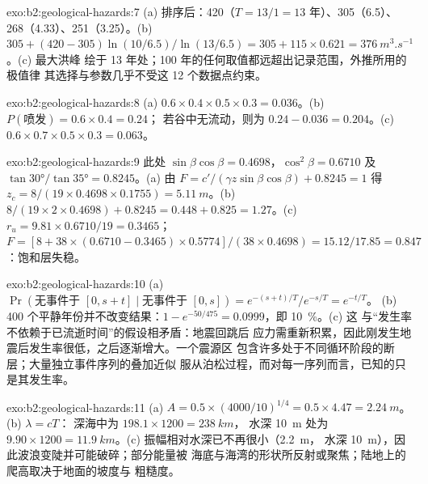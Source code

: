 \begin{solution}{exo:b2:geological-hazards:7}
(a) 排序后：420（$T = 13/1 = 13$ 年）、305（6.5）、268（4.33）、251（3.25）。(b) $305 + (420 -
305)\ln(10/6.5)/\ln(13/6.5) = 305 + 115 \times 0.621 = \qty{376}{m^3.s^{-1}}$。(c) 最大洪峰
绘于 13 年处；100 年的任何取值都远超出记录范围，外推所用的极值律
其选择与参数几乎不受这 12 个数据点约束。
\end{solution}

\begin{solution}{exo:b2:geological-hazards:8}
(a) $0.6 \times 0.4 \times 0.5 \times 0.3 = 0.036$。(b) $P(\text{喷发}) = 0.6 \times 0.4 = 0.24$；
若谷中无流动，则为 $0.24 - 0.036 = 0.204$。(c) $0.6 \times 0.7 \times 0.5 \times 0.3 =
0.063$。
\end{solution}

\begin{solution}{exo:b2:geological-hazards:9}
此处 $\sin\beta\cos\beta = 0.4698$，$\cos^2\beta = 0.6710$ 及 $\tan\ang{30}/\tan\ang{35} =
0.8245$。(a) 由 $F = c'/(\gamma z\sin\beta\cos\beta) + 0.8245 = 1$ 得 $z_c = 8/(19 \times 0.4698
\times 0.1755) = \qty{5.11}{m}$。(b) $8/(19 \times 2 \times 0.4698) + 0.8245 = 0.448 + 0.825 =
1.27$。(c) $r_u = 9.81 \times 0.6710/19 = 0.3465$；$F = [8 + 38 \times (0.6710 - 0.3465) \times
0.5774]/(38 \times 0.4698) = 15.12/17.85 = 0.847$：饱和层失稳。
\end{solution}

\begin{solution}{exo:b2:geological-hazards:10}
(a) $\Pr(\text{无事件于 } [0, s+t] \mid \text{无事件于 } [0, s]) = e^{-(s+t)/T}/e^{-s/T} = e^{-t/T}$。
(b) 400 个平静年份并不改变结果：$1 - e^{-50/475} = 0.0999$，即 \qty{10}{\percent}。(c) 这
与“发生率不依赖于已流逝时间”的假设相矛盾：地震回跳后
应力需重新积累，因此刚发生地震后发生率很低，之后逐渐增大。一个震源区
包含许多处于不同循环阶段的断层；大量独立事件序列的叠加近似
服从泊松过程，而对每一序列而言，已知的只是其发生率。
\end{solution}

\begin{solution}{exo:b2:geological-hazards:11}
(a) $A = 0.5 \times (4000/10)^{1/4} = 0.5 \times 4.47 = \qty{2.24}{m}$。(b) $\lambda = cT$：
深海中为 $198.1 \times 1200 = \qty{238}{km}$，
水深 \qty{10}{m} 处为 $9.90 \times 1200 = \qty{11.9}{km}$。(c) 振幅相对水深已不再很小（\qty{2.2}{m}，
水深 \qty{10}{m}），因此波浪变陡并可能破碎；部分能量被
海底与海湾的形状所反射或聚焦；陆地上的爬高取决于地面的坡度与
粗糙度。
\end{solution}

